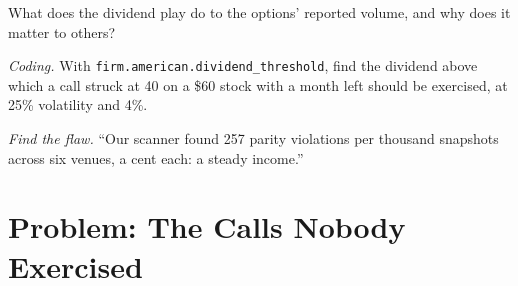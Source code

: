\begin{exercise}[$\star\star$]\label{exo:hf:options-cross-venue-and-volatility-arbitrage-at-speed:6}
What does the dividend play do to the options' reported volume, and why does it matter to others?
\end{exercise}

\begin{exercise}[$\star\star\star$]\label{exo:hf:options-cross-venue-and-volatility-arbitrage-at-speed:7}
\emph{Coding.} With \texttt{firm.american.dividend\_threshold}, find the dividend above which a call struck at 40 on a \$60 stock with a month left
should be exercised, at 25\% volatility and 4\%.
\end{exercise}

\begin{exercise}[$\star\star\star$]\label{exo:hf:options-cross-venue-and-volatility-arbitrage-at-speed:8}
\emph{Find the flaw.} ``Our scanner found 257 parity violations per thousand snapshots across six venues, a cent each: a steady income.''
\end{exercise}

\section{Problem: The Calls Nobody Exercised}

